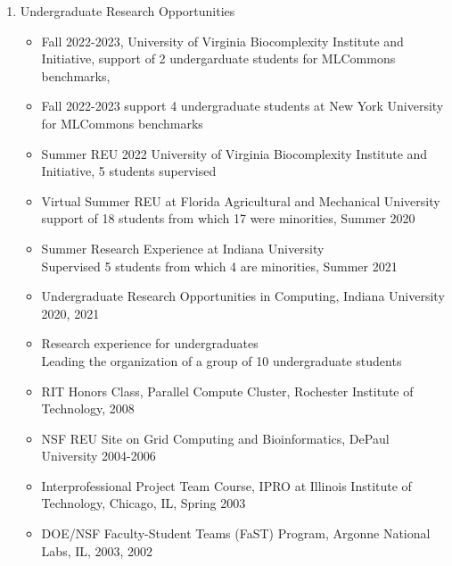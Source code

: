 \documentclass{article}
\begin{document}
\begin{enumerate}

\item Undergraduate Research Opportunities
  
  \begin{itemize}
    \item Fall 2022-2023, University of Virginia Biocomplexity
      Institute and Initiative, support of 2 undergarduate students
      for MLCommons benchmarks,
      \item Fall 2022-2023 support 4 undergraduate students at New
        York University for MLCommons benchmarks
    \item Summer REU 2022 University of Virginia Biocomplexity
      Institute and Initiative, 5 students supervised
  \item  Virtual Summer REU at Florida Agricultural and Mechanical University~\\
  support of 18 students from which 17 were minorities, Summer 2020
\item  Summer Research Experience at Indiana University ~\\
  Supervised 5 students from which 4 are minorities,  Summer 2021
\item  Undergraduate Research Opportunities in Computing,
  Indiana University 2020, 2021
\item Research experience for undergraduates~\\
  Leading the organization of a group of 10 undergraduate students



    \item RIT Honors Class, Parallel Compute Cluster, Rochester Institute of Technology, 2008
    \item NSF REU Site on Grid Computing and Bioinformatics, DePaul University 2004-2006 
    \item Interprofessional Project Team Course, IPRO at Illinois Institute of Technology, Chicago, IL, Spring 2003
    \item DOE/NSF Faculty-Student Teams (FaST) Program, Argonne National Labs, IL, 2003, 2002 

  \end{itemize}
  

\end{enumerate}
\end{document}
